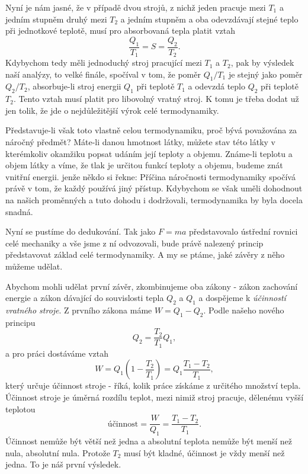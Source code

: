     Nyní je nám jasné, že v případě dvou strojů, z nichž jeden pracuje mezi \(T_1\) a jedním stupněm
    druhý mezi \(T_2\) a jedním stupněm a oba odevzdávají stejné teplo při jednotkové teplotě, musí
    pro absorbovaná tepla platit vztah
    \begin{equation}\label{fyz:eq701}
      \frac{Q_1}{T_1} = S = \frac{Q_2}{T_2}. 
    \end{equation}
    Kdybychom tedy měli jednoduchý stroj pracující mezi \(T_1\) a \(T_2\), pak by výsledek naší
    analýzy, to velké ﬁnále, spočíval v tom, že poměr \(Q_1/T_1\) je stejný jako poměr \(Q_2/T_2\),
    absorbuje-li stroj energii \(Q_1\) při teplotě \(T_1\) a odevzdá teplo \(Q_2\) při teplotě
    \(T_2\). Tento vztah musí platit pro libovolný vratný stroj. K tomu je třeba dodat už jen tolik,
    že jde o nejdůležitější výrok celé termodynamiky.

    Představuje-li však toto vlastně celou termodynamiku, proč bývá považována za náročný předmět?
    Máte-li danou hmotnost látky, můžete stav této látky v kterémkoliv okamžiku popsat udáním její
    teploty a objemu. Známe-li teplotu a objem látky a víme, že tlak je určitou funkcí teploty a
    objemu, budeme znát vnitřní energii. jenže někdo si řekne:  Příčina náročnosti
    termodynamiky spočívá právě v tom, že každý používá jiný přístup. Kdybychom se však uměli
    dohodnout na našich proměnných a tuto dohodu i dodržovali, termodynamika by byla docela snadná.

    Nyní se pustíme do dedukování. Tak jako \(F = ma\) představovalo ústřední rovnici celé mechaniky
    a vše jsme z ní odvozovali, bude právě nalezený princip představovat základ celé termodynamiky.
    A my se ptáme, jaké závěry z něho můžeme udělat.

    Abychom mohli udělat první závěr, zkombinujeme oba zákony - zákon zachování energie a zákon
    dávající do souvislosti tepla \(Q_2\) a \(Q_1\) a dospějeme k \emph{účinností vratného stroje}.
    Z prvního zákona máme \(W= Q_1 - Q_2\). Podle našeho nového principu
    \begin{equation*}
      Q_2=\frac{T_2}{T_1}Q_1,
    \end{equation*}
    a pro práci dostáváme vztah
    \begin{equation}\label{fyz:eq702}
      W=Q_1\left(1−\frac{T_2}{T_1}\right)=Q_1\frac{T_1−T_2}{T_1},
    \end{equation}   
    který určuje účinnost stroje - říká, kolik práce získáme z určitého množství tepla. Účinnost
    stroje je úměrná rozdílu teplot, mezi nimiž stroj pracuje, dělenému vyšší teplotou
    \begin{equation}\label{fyz:eq703}
      \text{účinnost} = \frac{W}{Q_1}=\frac{T_1−T_2}{T_1}.
    \end{equation} 
    Účinnost nemůže být větší než jedna a absolutní teplota nemůže být menší než nula, absolutní
    nula. Protože \(T_2\) musí být kladné, účinnost je vždy menší než jedna. To je náš první
    výsledek.

